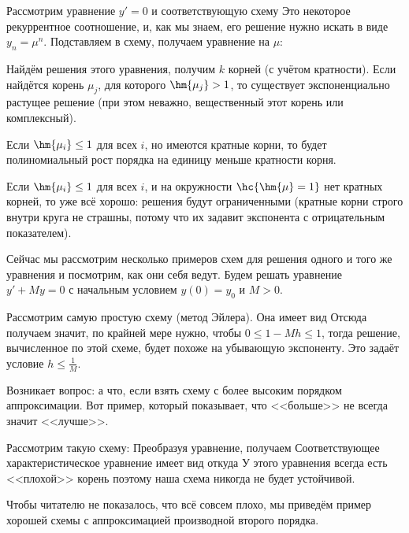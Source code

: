 \documentclass[a4paper]{article}
\begin{document}
Рассмотрим уравнение $y' = 0$ и соответствующую схему
  Это некоторое рекуррентное
соотношение, и, как мы знаем, его решение нужно искать в виде $y_n =
\mu^n$. Подставляем в схему, получаем уравнение на $\mu$:

Найдём решения этого уравнения, получим $k$ корней (с учётом
кратности).  Если найдётся корень $\mu_j$, для которого $\hm{\mu_j} >
1$, то существует экспоненциально растущее решение (при этом неважно,
вещественный этот корень или комплексный).

Если $\hm{\mu_i} \le 1$ для всех $i$, но имеются кратные корни, то
будет полиномиальный рост порядка на единицу меньше кратности корня.

Если $\hm{\mu_i} \le 1$ для всех $i$, и на окружности $\hc{\hm{\mu} =
  1}$ нет кратных корней, то уже всё хорошо: решения будут
ограниченными (кратные корни строго внутри круга не страшны, потому
что их задавит экспонента с отрицательным показателем).

Сейчас мы рассмотрим несколько примеров схем для решения одного и того
же уравнения и посмотрим, как они себя ведут.  Будем решать уравнение
$y' + My = 0$ с начальным условием $y(0) = y_0$ и $M > 0$.

\begin{ex}
Рассмотрим самую простую схему (метод Эйлера). Она имеет вид
  Отсюда получаем
 значит, по крайней мере нужно, чтобы $0\le
1 - Mh \le 1$, тогда решение, вычисленное по этой схеме, будет похоже
на убывающую экспоненту. Это задаёт условие $h \le \frac{1}{M}$.
\end{ex}

Возникает вопрос: а что, если взять схему с более высоким порядком
аппроксимации.  Вот пример, который показывает, что <<больше>> не
всегда значит <<лучше>>.

\begin{ex}
Рассмотрим такую схему:   Преобразуя уравнение, получаем   Соответствующее характеристическое уравнение имеет
вид  откуда   У этого уравнения всегда есть <<плохой>> корень
 поэтому
наша схема никогда не будет устойчивой.
\end{ex}

Чтобы читателю не показалось, что всё совсем плохо, мы приведём пример
хорошей схемы с аппроксимацией производной второго порядка.
\end{document}
